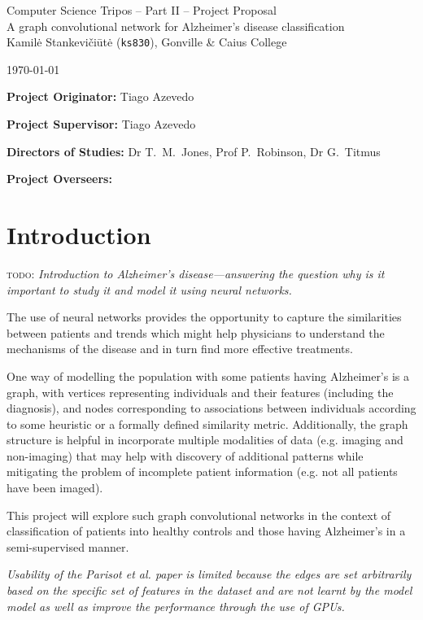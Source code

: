 \documentclass[12pt,a4paper,twoside]{article}
\begin{document}
\begin{center}
\Large
Computer Science Tripos -- Part II -- Project Proposal\\[4mm]
\LARGE
A graph convolutional network for Alzheimer's disease classification\\[4mm]

\large
Kamilė Stankevičiūtė (\texttt{ks830}), Gonville \& Caius College

\today %
\end{center}

\vspace{5mm}
\textbf{Project Originator:} Tiago Azevedo

\textbf{Project Supervisor:} Tiago Azevedo

\textbf{Directors of Studies:} Dr T.~M.~Jones, Prof P.~Robinson, Dr G.~Titmus

\textbf{Project Overseers:} 


\section*{Introduction}

\textsc{todo:} \textit{Introduction to Alzheimer's disease—answering the question why is it important to study it and model it using neural networks.}

The use of neural networks provides the opportunity to capture the similarities between patients and trends which might help physicians to understand the mechanisms of the disease and in turn find more effective treatments. 

One way of modelling the population with some patients having Alzheimer's is a graph, with vertices representing individuals and their features (including the diagnosis), and nodes corresponding to associations between individuals according to some heuristic or a formally defined similarity metric. Additionally, the graph structure is helpful in incorporate multiple modalities of data (e.g. imaging and non-imaging) that may help with discovery of additional patterns while mitigating the problem of incomplete patient information (e.g. not all patients have been imaged). 

This project will explore such graph convolutional networks in the context of  classification of patients into healthy controls and those having Alzheimer's in a semi-supervised manner. 

\textit{Usability of the Parisot et al. paper is limited because the edges are set arbitrarily based on the specific set of features in the dataset and are not learnt by the model model as well as improve the performance through the use of GPUs.}
\end{document}
